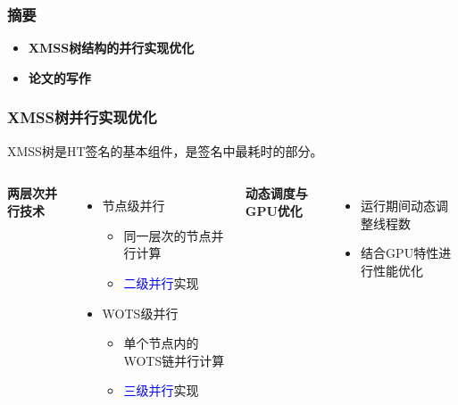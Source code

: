 \documentclass[slide]{../../custom}
\begin{document}
\begin{frame}
  \titlepage
\end{frame}

\begin{frame}
  \frametitle{摘要}
  \begin{itemize}
    \item \textbf{XMSS树结构的并行实现优化}
    \item \textbf{论文的写作}
  \end{itemize}
\end{frame}

\begin{frame}
  \frametitle{XMSS树并行实现优化}
  XMSS树是HT签名的基本组件，是签名中最耗时的部分。
  \vfill
  \begin{columns}
    \textbf{两层次并行技术}
    \begin{itemize}
      \item 节点级并行
        \begin{itemize}
          \item 同一层次的节点并行计算
          \item \textcolor{blue}{二级并行}实现 \cite{Wang2025}
        \end{itemize}
      \item WOTS级并行
        \begin{itemize}
          \item 单个节点内的WOTS链并行计算
          \item \textcolor{blue}{三级并行}实现 \cite{Wang2025}
        \end{itemize}
    \end{itemize}

    \textbf{动态调度与GPU优化}
    \begin{itemize}
      \item 运行期间动态调整线程数
      \item 结合GPU特性进行性能优化
    \end{itemize}
  \end{columns}
\end{frame}
\end{document}
